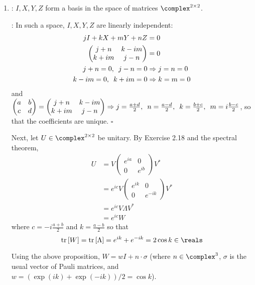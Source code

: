 \begingroup
\newcommand{\tr}[1]{\mathrm{tr} \left[ #1 \right]}
\newcommand{\re}[1]{\mathrm{Re} \left( #1 \right)}
\newcommand{\expo}[1]{\exp \left( #1 \right)}
\newcommand{\coso}[1]{\cos \left( #1 \right)}
\newcommand{\sino}[1]{\sin \left( #1 \right)}
%
\begin{enumerate}
\item {}: $I, X, Y, Z$ form a basis in the space of matrices $\complex^{2 \times 2}$.
%
\par \proof: In such a space, $I, X, Y, Z$ are linearly independent:
%
\begin{align}
j I + k X + m Y + n Z &= 0 \\
\begin{pmatrix} j + n & k - i m \\ k + i m & j - n \end{pmatrix} &= 0 \\
j + n = 0, \enskip j - n = 0 &\Rightarrow j = n = 0 \\
k - i m = 0, \enskip k + i m = 0 &\Rightarrow k = m = 0
\end{align}
%
and $\begin{pmatrix} a & b \\ c & d \end{pmatrix} = \begin{pmatrix} j + n & k - i m \\ k + i m & j - n \end{pmatrix} \Rightarrow j = \frac{a+d}{2}, \enskip n = \frac{a-d}{2}, \enskip k = \frac{b+c}{2}, \enskip m = i \frac{b-c}{2}$, so that the coefficients are unique. \hfill $\square$
%
\par Next, let $U \in \complex^{2 \times 2}$ be unitary.
%
By Exercise 2.18 and the spectral theorem,
%
\begin{align}
U &= V \begin{pmatrix} e^{ia} & 0 \\ 0 & e^{ib} \end{pmatrix} V^* \\
&= e^{ic} V \begin{pmatrix} e^{ik} & 0 \\ 0 & e^{-i k} \end{pmatrix} V^* \\
&= e^{ic} V \Lambda V^* \\
&= e^{ic} W
\end{align}
%
where $c = -i\frac{a+b}{2}$ and $k = \frac{a-b}{2}$ so that
%
$$
\tr{W} = \tr{\Lambda} = e^{ik} + e^{-ik} = 2 \cos k \in \reals
$$
%
\par Using the above proposition, $W = w I + n \cdot \sigma$ (where $n \in \complex^3$, $\sigma$ is the usual vector of Pauli matrices, and $w = \left( \expo{ik} + \expo{-ik} \right) / 2 = \cos k$).

\end{enumerate}
